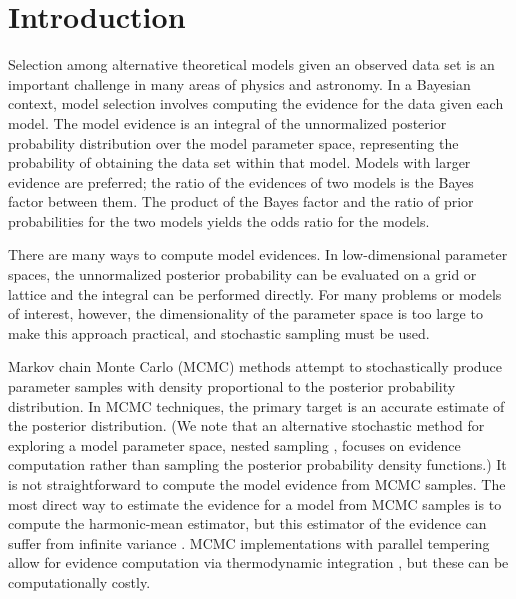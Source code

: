 \documentclass{rsos}
\begin{document}


\maketitle

\section{Introduction}

Selection among alternative theoretical models given an observed data
set is an important challenge in many areas of physics and astronomy.
In a Bayesian context, model selection involves computing the evidence
for the data given each model.  The model evidence is an integral of
the unnormalized posterior probability distribution over the model
parameter space, representing the probability of obtaining the data
set within that model.  Models with larger evidence are preferred; the
ratio of the evidences of two models is the Bayes factor between them.
The product of the Bayes factor and the ratio of prior probabilities
for the two models yields the odds ratio for the models.

There are many ways to compute model evidences.  In low-dimensional
parameter spaces, the unnormalized posterior probability can be
evaluated on a grid or lattice and the integral can be performed
directly.  For many problems or models of interest, however, the
dimensionality of the parameter space is too large to make this approach
practical, and stochastic sampling must be used.  

Markov chain Monte Carlo (MCMC) methods attempt to stochastically
produce parameter samples with density proportional to the posterior
probability distribution.  In MCMC techniques, the primary target is
an accurate estimate of the posterior distribution.  (We note that an
alternative stochastic method for exploring a model parameter space,
nested sampling \cite{Skilling:2004,Skilling:2006,Feroz:2009},
focuses on evidence computation rather than sampling the posterior
probability density functions.)  It is not straightforward to compute
the model evidence from MCMC samples.  The most direct way to estimate
the evidence for a model from MCMC samples is to compute the
harmonic-mean estimator, but this estimator of the evidence  can suffer
from infinite variance 
\cite{NewtonRaftery:1994,Chib:1995,vanHaasteren:2009,WolpertSchmidler:2012}.  MCMC
implementations with parallel tempering \cite{SwendsenWang:1986,EarlDeem:2005} allow
for evidence computation via thermodynamic integration \cite{FrielPettitt:2008}, but these can
be computationally costly.
\end{document}
